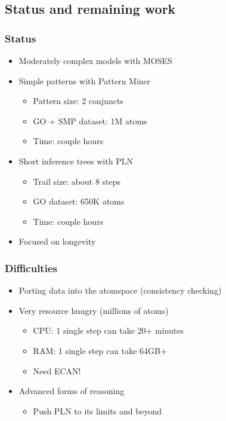 \documentclass[aspectratio=169]{beamer}
\begin{document}
\subsection{Status and remaining work}

\begin{frame}
  \frametitle{Status}

  \begin{itemize}
  \item Moderately complex models with MOSES
  \item Simple patterns with Pattern Miner
    \begin{itemize}
    \item Pattern size: 2 conjuncts
    \item GO + SMP dataset: 1M atoms
    \item Time: couple hours
    \end{itemize}
  \item Short inference trees with PLN
    \begin{itemize}
    \item Trail size: about 8 steps
    \item GO dataset: 650K atoms
    \item Time: couple hours
    \end{itemize}
  \item Focused on longevity
  \end{itemize}
\end{frame}

\begin{frame}
  \frametitle{Difficulties}

  \begin{itemize}
  \item Porting data into the atomspace (consistency checking)
  \item Very resource hungry (millions of atoms)\\
    \begin{itemize}
    \item CPU: 1 single step can take 20+ minutes
    \item RAM: 1 single step can take 64GB+
    \item Need ECAN!
    \end{itemize}
  \item Advanced forms of reasoning\\
    \begin{itemize}
    \item Push PLN to its limits and beyond
    \end{itemize}
  \end{itemize}
\end{frame}
\end{document}
